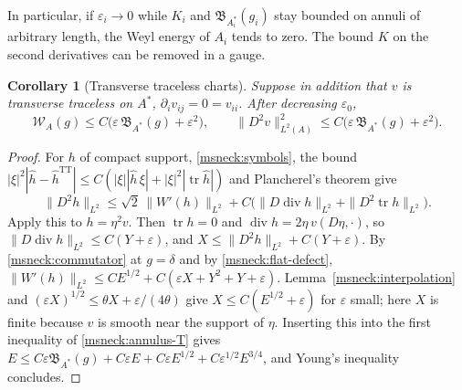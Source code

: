 \documentclass[11pt]{article}
\numberwithin{equation}{section}
\newtheorem{corollary}[theorem]{Corollary}
\theoremstyle{definition}
\theoremstyle{remark}
\DeclareMathOperator{\tr}{tr}
\begin{document}
In particular, if \(\varepsilon_i\to0\) while \(K_i\) and
\(\mathfrak B_{A_i^*}(g_i)\) stay bounded on annuli of arbitrary length,
the Weyl energy of \(A_i\) tends to zero. The bound \(K\) on the second
derivatives can be removed in a gauge.

\begin{corollary}[Transverse traceless charts]\label{msneck:tt-chart}
Suppose in addition that \(v\) is transverse traceless on \(A^*\),
\(\partial_iv_{ij}=0=v_{ii}\). After decreasing \(\varepsilon_0\),
\[
 \mathcal W_A(g)\le C\bigl(\varepsilon\,\mathfrak B_{A^*}(g)+\varepsilon^2\bigr),
 \qquad
 \|D^2v\|_{L^2(A)}^2\le C\bigl(\varepsilon\,\mathfrak B_{A^*}(g)+\varepsilon^2\bigr).
\]
\end{corollary}

\begin{proof}
For \(h\) of compact support, \eqref{msneck:symbols}, the bound
\(|\xi|^2|\hat h-\hat h^{\mathrm{TT}}|\le C(|\xi||\hat h\,\xi|+|\xi|^2|\tr\hat h|)\)
and Plancherel's theorem give
\begin{equation}\label{msneck:korn}
 \|D^2h\|_{L^2}\le\sqrt2\,\|W'(h)\|_{L^2}
 +C\bigl(\|D\operatorname{div}h\|_{L^2}+\|D^2\tr h\|_{L^2}\bigr).
\end{equation}
Apply this to \(h=\eta^2v\). Then \(\tr h=0\) and
\(\operatorname{div}h=2\eta\,v(D\eta,\cdot)\), so
\(\|D\operatorname{div}h\|_{L^2}\le C(Y+\varepsilon)\), and
\(X\le\|D^2h\|_{L^2}+C(Y+\varepsilon)\). By \eqref{msneck:commutator} at
\(g=\delta\) and by \eqref{msneck:flat-defect},
\(\|W'(h)\|_{L^2}\le CE^{1/2}+C(\varepsilon X+Y^2+Y+\varepsilon)\).
Lemma~\ref{msneck:interpolation} and
\((\varepsilon X)^{1/2}\le\theta X+\varepsilon/(4\theta)\) give
\(X\le C(E^{1/2}+\varepsilon)\) for \(\varepsilon\) small; here \(X\) is finite
because \(v\) is smooth near the support of \(\eta\). Inserting this into
the first inequality of \eqref{msneck:annulus-T} gives
\(E\le C\varepsilon\mathfrak B_{A^*}(g)+C\varepsilon E+C\varepsilon E^{1/2}
+C\varepsilon^{1/2}E^{3/4}\), and Young's inequality concludes.
\end{proof}
\end{document}
